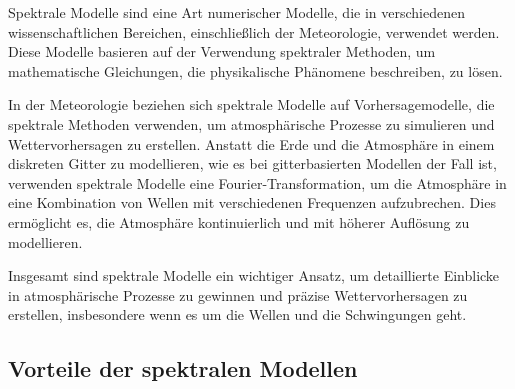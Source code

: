 Spektrale Modelle sind eine Art numerischer Modelle, die in verschiedenen wissenschaftlichen Bereichen, einschließlich der Meteorologie, verwendet werden.
Diese Modelle basieren auf der Verwendung spektraler Methoden, um mathematische Gleichungen, die physikalische Phänomene beschreiben, zu lösen.

In der Meteorologie beziehen sich spektrale Modelle auf Vorhersagemodelle, die spektrale Methoden verwenden, um atmosphärische Prozesse zu simulieren und Wettervorhersagen zu erstellen.
Anstatt die Erde und die Atmosphäre in einem diskreten Gitter zu modellieren, wie es bei gitterbasierten Modellen der Fall ist, verwenden spektrale Modelle eine Fourier-Transformation, um die Atmosphäre in eine Kombination von Wellen mit verschiedenen Frequenzen aufzubrechen.
Dies ermöglicht es, die Atmosphäre kontinuierlich und mit höherer Auflösung zu modellieren.

Insgesamt sind spektrale Modelle ein wichtiger Ansatz, um detaillierte Einblicke in atmosphärische Prozesse zu gewinnen und präzise Wettervorhersagen zu erstellen, insbesondere wenn es um die Wellen und die Schwingungen geht.

\subsection{Vorteile der spektralen Modellen
\label{spektral:subsection:vorteile}}

